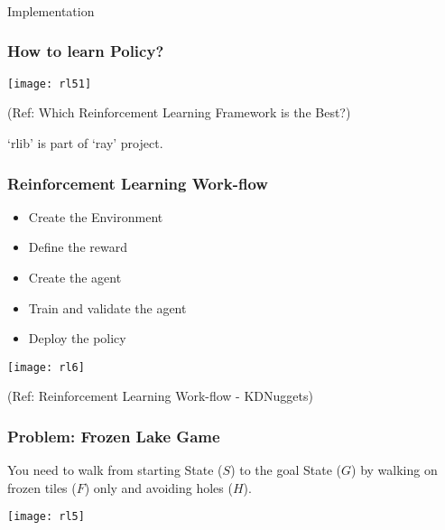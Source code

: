 
\begin{frame}[fragile]\frametitle{}
\begin{center}
{\Large Implementation}
\end{center}
\end{frame}

\begin{frame}[fragile]\frametitle{How to learn Policy?}

\begin{center}
\texttt{[image: rl51]}
\end{center}

{\tiny (Ref: Which Reinforcement Learning Framework is the Best?)}

‘rlib' is part of `ray' project.

\end{frame}


\begin{frame}[fragile]\frametitle{Reinforcement Learning Work-flow}

\begin{itemize}
\item Create the Environment
\item Define the reward
\item Create the agent
\item Train and validate the agent
\item Deploy the policy
\end{itemize}

\begin{center}
\texttt{[image: rl6]}

{\tiny (Ref: Reinforcement Learning Work-flow - KDNuggets)} 
\end{center}

\end{frame}



\begin{frame}[fragile]\frametitle{Problem: Frozen Lake Game}


You need to walk from starting State ($S$) to the goal State ($G$) by walking on frozen tiles ($F$) only and avoiding holes ($H$).


\begin{center}
\texttt{[image: rl5]}
\end{center}

\end{frame}

